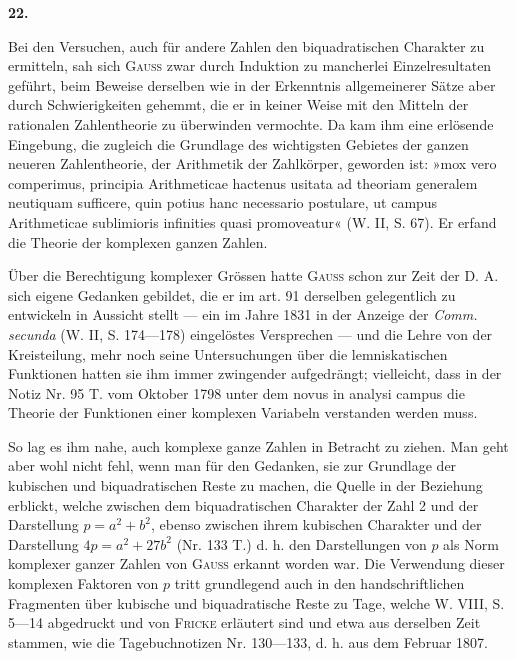 \begin{center}\bfseries 22.\end{center}
\noindent\hspace*{\parindent}Bei den Versuchen, auch für andere Zahlen den biquadratischen Charakter zu ermitteln, sah sich \textsc{Gauss} zwar durch Induktion zu mancherlei Einzelresultaten geführt, beim Beweise derselben wie in der Erkenntnis allgemeinerer Sätze aber durch Schwierigkeiten gehemmt, die er in keiner Weise mit
\newpage{}
\noindent den Mitteln der rationalen Zahlentheorie zu überwinden vermochte. Da kam ihm eine erlösende Eingebung, die zugleich die Grundlage des wichtigsten Gebietes der ganzen neueren Zahlentheorie, der Arithmetik der Zahlkörper, geworden ist: »mox vero comperimus, principia Arithmeticae hactenus usitata ad theoriam generalem neutiquam sufficere, quin potius hanc necessario postulare, ut campus Arithmeticae sublimioris infinities quasi promoveatur« (W. II, S. 67). Er erfand die Theorie der komplexen ganzen Zahlen.

Über die Berechtigung komplexer Grössen hatte \textsc{Gauss} schon zur Zeit der D. A. sich eigene Gedanken gebildet, die er im art. 91 derselben gelegentlich zu entwickeln in Aussicht stellt — ein im Jahre 1831 in der Anzeige der \textit{Comm. secunda} (W. II, S. 174—178) eingelöstes Versprechen — und die Lehre von der Kreisteilung, mehr noch seine Untersuchungen über die lemniskatischen Funktionen hatten sie ihm immer zwingender aufgedrängt; vielleicht, dass in der Notiz Nr. 95 T. vom Oktober 1798 unter dem novus in analysi campus die Theorie der Funktionen einer komplexen Variabeln verstanden werden muss.

So lag es ihm nahe, auch komplexe ganze Zahlen in Betracht zu ziehen. Man geht aber wohl nicht fehl, wenn man für den Gedanken, sie zur Grundlage der kubischen und biquadratischen Reste zu machen, die Quelle in der Beziehung erblickt, welche zwischen dem biquadratischen Charakter der Zahl 2 und der Darstellung \(p=a^2+b^2\), ebenso zwischen ihrem kubischen Charakter und der Darstellung \(4p=a^2+27b^2\) (Nr. 133 T.) d. h. den Darstellungen von \(p\) als Norm komplexer ganzer Zahlen von \textsc{Gauss} erkannt worden war. Die Verwendung dieser komplexen Faktoren von \(p\) tritt grundlegend auch in den handschriftlichen Fragmenten über kubische und biquadratische Reste zu Tage, welche W. VIII, S. 5—14 abgedruckt und von \textsc{Fricke} erläutert sind und etwa aus derselben Zeit stammen, wie die Tagebuchnotizen Nr. 130—133, d. h. aus dem Februar 1807.

